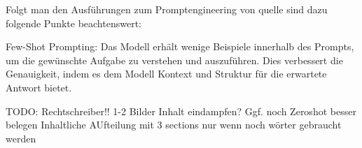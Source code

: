 Folgt man den Ausführungen zum Promptengineering von quelle sind dazu folgende Punkte beachtenswert:

Few-Shot Prompting: Das Modell erhält wenige Beispiele innerhalb des Prompts, um die gewünschte Aufgabe zu verstehen und auszuführen. Dies verbessert die Genauigkeit, indem es dem Modell Kontext und Struktur für die erwartete Antwort bietet. 




TODO:
Rechtschreiber!!
1-2 Bilder
Inhalt eindampfen?
Ggf. noch Zeroshot besser belegen
Inhaltliche AUfteilung mit 3 sections nur wenn noch wörter gebraucht werden
